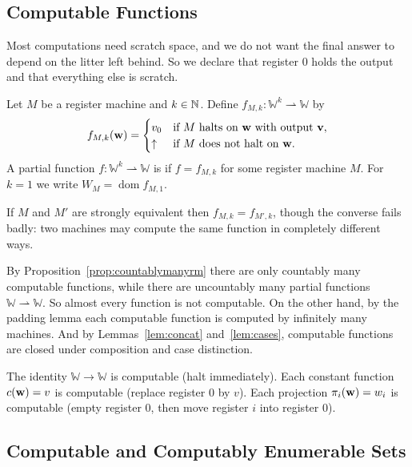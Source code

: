 \documentclass[a4paper]{scrartcl}
\newcommand{\WW}{\mathbb{W}}
\newcommand{\dom}{\operatorname{dom}}
\begin{document}
\subsection{Computable Functions}

Most computations need scratch space, and we do not want the final answer to depend on the litter left behind. So we declare that register $0$ holds the output and that everything else is scratch.

\begin{definition}
	Let $M$ be a register machine and $k \in \mathbb{N}$. Define $f_{M,k} \colon \WW^k \rightharpoonup \WW$ by
	$$f_{M,k}(\mathbf{w}) = \begin{cases} v_0 & \text{if } M \text{ halts on } \mathbf{w} \text{ with output } \mathbf{v}, \\ \uparrow & \text{if } M \text{ does not halt on } \mathbf{w}.\end{cases}$$
	A partial function $f \colon \WW^k \rightharpoonup \WW$ is  if $f = f_{M,k}$ for some register machine $M$. For $k = 1$ we write $W_M = \dom f_{M,1}$.
\end{definition}

If $M$ and $M'$ are strongly equivalent then $f_{M,k} = f_{M',k}$, though the converse fails badly: two machines may compute the same function in completely different ways.

\begin{remark}\label{rem:countablycomputable}
	By Proposition~\ref{prop:countablymanyrm} there are only countably many computable functions, while there are uncountably many partial functions $\WW \rightharpoonup \WW$. So almost every function is not computable. On the other hand, by the padding lemma each computable function is computed by infinitely many machines. And by Lemmas~\ref{lem:concat} and~\ref{lem:cases}, computable functions are closed under composition and case distinction.
\end{remark}

\begin{example}
	The identity $\WW \to \WW$ is computable (halt immediately). Each constant function $c(\mathbf{w}) = v$ is computable (replace register $0$ by $v$). Each projection $\pi_i(\mathbf{w}) = w_i$ is computable (empty register $0$, then move register $i$ into register $0$).
\end{example}

\subsection{Computable and Computably Enumerable Sets}
\end{document}
